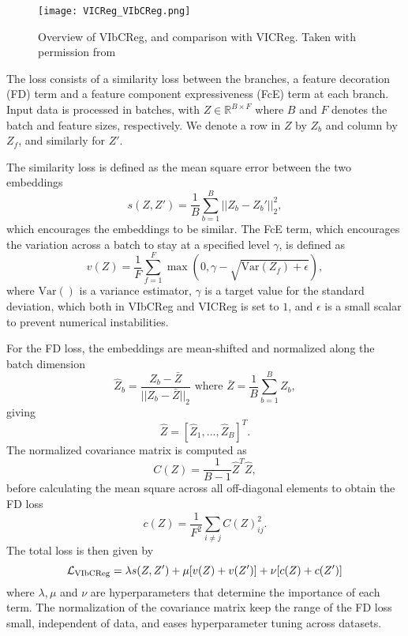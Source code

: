 \documentclass[../../thesis.tex]{subfiles}
\begin{document}
\begin{figure}[h]
    \texttt{[image: VICReg\_VIbCReg.png]}
    \centering    
    \caption{Overview of VIbCReg, and comparison with VICReg. Taken with permission from \cite{lee2024computer}}
    \label{fig:VIbCReg}
\end{figure}

The loss consists of a similarity loss between the branches, a feature decoration (FD) term and a feature component expressiveness (FcE) term at each branch. Input data is processed in batches, with $Z \in \mathbb{R}^{B\times F}$ where $B$ and $F$ denotes the batch and feature sizes, respectively. We denote a row in $Z$ by $Z_b$ and column by $Z_f$, and similarly for $Z'$.\newline

The similarity loss is defined as the mean square error between the two embeddings
\begin{equation}
    s(Z,Z') = \frac{1}{B} \sum_{b=1}^B || Z_b-Z_b'||_2^2,
\end{equation}
which encourages the embeddings to be similar. The FcE term, which encourages the variation across a batch to stay at a specified level $\gamma$, is defined as 
\begin{equation}
    v(Z) =  \frac{1}{F} \sum_{f=1}^F \max(0,\gamma - \sqrt{\text{Var}(Z_f)+\epsilon}),
\end{equation}
where $\text{Var}()$ is a variance estimator, $\gamma$ is a target value for the standard deviation, which both in VIbCReg and VICReg is set to $1$, and $\epsilon$ is a small scalar to prevent numerical instabilities. 
\newline 

For the FD loss, the embeddings are mean-shifted and normalized along the batch dimension
\begin{equation}
    \widehat{Z}_b = \frac{Z_b-\bar{Z}}{||Z_b-\bar{Z}||_2} \text{ where }  \bar{Z} = \frac{1}{B}\sum_{b=1}^B  Z_b,
\end{equation}
giving 
\begin{equation}
    \widehat{Z} = [\widehat{Z}_1,...,\widehat{Z}_B]^T.
\end{equation}
The normalized covariance matrix is computed as
\begin{equation}
    C(Z) = \frac{1}{B-1}\widehat{Z}^T \widehat{Z},
\end{equation}
before calculating the mean square across all off-diagonal elements to obtain the FD loss
\begin{equation}
    c(Z) = \frac{1}{F^2}\sum_{i\neq j} C(Z)_{ij}^2.
\end{equation}
The total loss is then given by
\begin{equation}
    \label{eq:VIbCRegLoss}
    \mathcal{L}_\text{VIbCReg} = \lambda s(Z,Z') + \mu [v(Z) + v(Z')] + \nu[c(Z)+c(Z')]
\end{equation}
where $\lambda, \mu$ and $\nu$ are hyperparameters that determine the importance of each term. The normalization of the covariance matrix keep the range of the FD loss small, independent of data, and eases hyperparameter tuning across datasets.

\end{document}
